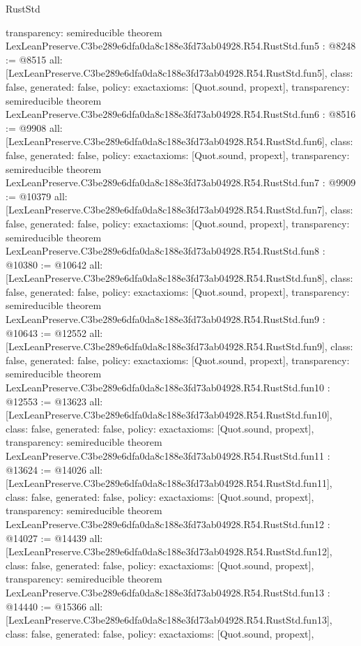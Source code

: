 \begin{lexlean}{RustStd}
\begin{coremodule}
{  transparency: semireducible
}
theorem LexLeanPreserve.C3be289e6dfa0da8c188e3fd73ab04928.R54.RustStd.fun5 : @8248 := @8515 {
  all: [LexLeanPreserve.C3be289e6dfa0da8c188e3fd73ab04928.R54.RustStd.fun5],
  class: false,
  generated: false,
  policy: exact{axioms: [Quot.sound, propext]},
  transparency: semireducible
}
theorem LexLeanPreserve.C3be289e6dfa0da8c188e3fd73ab04928.R54.RustStd.fun6 : @8516 := @9908 {
  all: [LexLeanPreserve.C3be289e6dfa0da8c188e3fd73ab04928.R54.RustStd.fun6],
  class: false,
  generated: false,
  policy: exact{axioms: [Quot.sound, propext]},
  transparency: semireducible
}
theorem LexLeanPreserve.C3be289e6dfa0da8c188e3fd73ab04928.R54.RustStd.fun7 : @9909 := @10379 {
  all: [LexLeanPreserve.C3be289e6dfa0da8c188e3fd73ab04928.R54.RustStd.fun7],
  class: false,
  generated: false,
  policy: exact{axioms: [Quot.sound, propext]},
  transparency: semireducible
}
theorem LexLeanPreserve.C3be289e6dfa0da8c188e3fd73ab04928.R54.RustStd.fun8 : @10380 := @10642 {
  all: [LexLeanPreserve.C3be289e6dfa0da8c188e3fd73ab04928.R54.RustStd.fun8],
  class: false,
  generated: false,
  policy: exact{axioms: [Quot.sound, propext]},
  transparency: semireducible
}
theorem LexLeanPreserve.C3be289e6dfa0da8c188e3fd73ab04928.R54.RustStd.fun9 : @10643 := @12552 {
  all: [LexLeanPreserve.C3be289e6dfa0da8c188e3fd73ab04928.R54.RustStd.fun9],
  class: false,
  generated: false,
  policy: exact{axioms: [Quot.sound, propext]},
  transparency: semireducible
}
theorem LexLeanPreserve.C3be289e6dfa0da8c188e3fd73ab04928.R54.RustStd.fun10 : @12553 := @13623 {
  all: [LexLeanPreserve.C3be289e6dfa0da8c188e3fd73ab04928.R54.RustStd.fun10],
  class: false,
  generated: false,
  policy: exact{axioms: [Quot.sound, propext]},
  transparency: semireducible
}
theorem LexLeanPreserve.C3be289e6dfa0da8c188e3fd73ab04928.R54.RustStd.fun11 : @13624 := @14026 {
  all: [LexLeanPreserve.C3be289e6dfa0da8c188e3fd73ab04928.R54.RustStd.fun11],
  class: false,
  generated: false,
  policy: exact{axioms: [Quot.sound, propext]},
  transparency: semireducible
}
theorem LexLeanPreserve.C3be289e6dfa0da8c188e3fd73ab04928.R54.RustStd.fun12 : @14027 := @14439 {
  all: [LexLeanPreserve.C3be289e6dfa0da8c188e3fd73ab04928.R54.RustStd.fun12],
  class: false,
  generated: false,
  policy: exact{axioms: [Quot.sound, propext]},
  transparency: semireducible
}
theorem LexLeanPreserve.C3be289e6dfa0da8c188e3fd73ab04928.R54.RustStd.fun13 : @14440 := @15366 {
  all: [LexLeanPreserve.C3be289e6dfa0da8c188e3fd73ab04928.R54.RustStd.fun13],
  class: false,
  generated: false,
  policy: exact{axioms: [Quot.sound, propext]},
}
\end{coremodule}
\end{lexlean}
